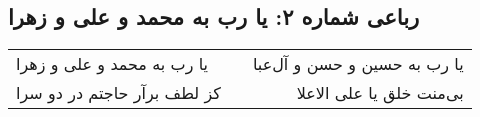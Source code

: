 \begin{center}
\section*{رباعی شماره ۲: یا رب به محمد و علی و زهرا}
\label{sec:sh002}
\begin{longtable}{l p{0.5cm} r}
یا رب به محمد و علی و زهرا
&&
یا رب به حسین و حسن و آل‌عبا
\\
کز لطف برآر حاجتم در دو سرا
&&
بی‌منت خلق یا علی الاعلا
\\
\end{longtable}
\end{center}
